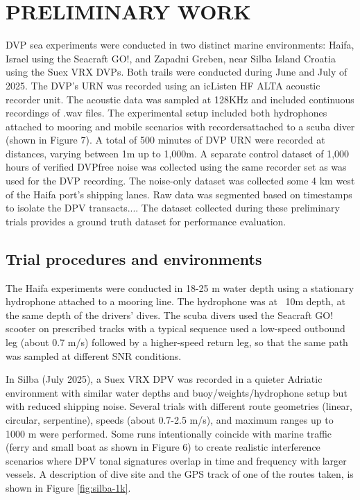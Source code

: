 \documentclass[12pt,a4paper]{article}
\begin{document}
\section{PRELIMINARY WORK}
DVP sea experiments were conducted in two distinct marine environments: Haifa, Israel using the Seacraft
GO!, and Zapadni Greben, near Silba Island Croatia using the Suex VRX DVPs. Both trails were conducted
during June and July of 2025. The DVP's URN was recorded using an icListen HF ALTA acoustic recorder
unit. The acoustic data was sampled at 128KHz and included continuous recordings of .wav files. The
experimental setup included both hydrophones attached to mooring and mobile scenarios with recordersattached to a scuba diver (shown in Figure 7). A total of 500 minutes of DVP URN were recorded at
distances, varying between 1m up to 1,000m. A separate control dataset of 1,000 hours of verified DVPfree noise was collected using the same recorder set as was used for the DVP recording. The noise-only
dataset was collected some 4 km west of the Haifa port's shipping lanes. Raw data was segmented based
on timestamps to isolate the DPV transacts.... The dataset collected during these preliminary trials
provides a ground truth dataset for performance evaluation.

\subsection{Trial procedures and environments}
The Haifa experiments were conducted in 18-25 m water depth using a stationary hydrophone attached to a mooring line. The hydrophone was at ~10m depth, at the same depth of the drivers' dives. The scuba divers used the Seacraft GO! scooter on prescribed tracks with a typical sequence used a low-speed outbound leg (about 0.7 m/s) followed by a higher-speed return leg, so that the same path was sampled at different SNR conditions.

In Silba (July 2025), a Suex VRX DPV was recorded in a quieter Adriatic environment with similar water depths and buoy/weights/hydrophone setup but with reduced shipping noise. Several trials with different route geometries (linear, circular, serpentine), speeds (about 0.7-2.5 m/s), and maximum ranges up to 1000 m were performed. Some runs intentionally coincide with marine traffic (ferry and small boat as shown in Figure 6) to create realistic interference scenarios where DPV tonal signatures overlap in time and
frequency with larger vessels. A description of dive site and the GPS track of one of the routes taken, is shown in Figure \ref{fig:silba-1k}.
\end{document}
